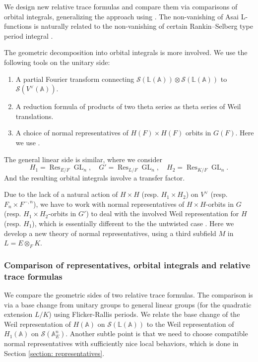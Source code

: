\documentclass[11pt, reqno]{amsart}
\numberwithin{equation}{subsection}
\theoremstyle{plain}
\theoremstyle{definition}
\newcommand{\BL}{\mathbb L}
\newcommand{\CS}{\mathcal{S}}
\DeclareMathOperator{\GL}{GL}
\DeclareMathOperator{\Res}{Res}
\begin{document}
We design new relative trace formulas and compare them via comparisons of orbital integrals, generalizing the approach \cite{Liu2014relative,Xue-GGP,Xue-Ichino,TGGP-Wang} using \cite{JPSS1983}. The non-vanishing of Asai L-functions is naturally related to the non-vanishing of certain Rankin–Selberg type period integral \cite{Flicker}.

The geometric decomposition into orbital integrals is more involved. We use the following tools on the unitary side:
\begin{enumerate}
    \item A partial Fourier transform connecting $\CS(\BL(\mathbb A)) \otimes \CS(\BL(\mathbb A))$ to $\CS(V^\vee(\mathbb A))$.
    \item A reduction formula of products of two theta series as theta series of Weil translations.
    \item A choice of normal representatives of $H(F) \times H(F)$ orbits in $G(F)$. Here we use \cite[Lemma 8.8]{Kottwitz1980}.
\end{enumerate} 
The general linear side is similar, where we consider 
\[
H_1 = \Res_{E/F} \GL_n, \quad G' = \Res_{L/F} \GL_n, \quad H_2 = \Res_{K/F} \GL_n.
\]
And the resulting orbital integrals involve a transfer factor.

 Due to the lack of a natural action of $H \times H$ (resp. $H_1 \times H_2$) on $V^\vee$  (resp. $F_n \times F^{-,n}$), we have to work with normal representatives of $H \times H$-orbits in $G$ (resp. $H_1 \times H_2$-orbits in $G'$) to deal with the involved Weil representation for $H$ (resp. $H_1$), which is essentially different to the the untwisted case \cite{Xue-GGP}. Here we develop a new theory of normal representatives, using a third subfield $M$ in $L=E \otimes_F K$.








\subsubsection{Comparison of representatives, orbital integrals and relative trace formulas}

We compare the geometric sides of two relative trace formulas. The comparison is via a base change from unitary groups to general linear groups (for the quadratic extension $L/K$) using Flicker-Rallis periods. We relate the base change of the Weil representation of $H(\mathbb A)$ on $\CS(\BL(\mathbb A))$ to the Weil representation of $H_1(\mathbb A)$ on $\CS(\mathbb A_E^n)$. Another subtle point is that we need to choose compatible normal representatives with sufficiently nice local behaviors, which is done in Section \ref{section: representatives}. 
\end{document}
